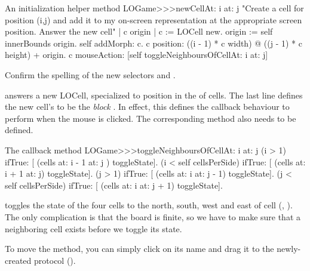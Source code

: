 \documentclass[a4paper,10pt,twoside]{book}
\begin{document}
\begin{method}[newCellAt:at:]{An initialization helper method}
LOGame>>>newCellAt: i at: j
   "Create a cell for position (i,j) and add it to my on-screen
   representation at the appropriate screen position.  Answer the new cell"
   | c origin |
   c := LOCell new.
   origin := self innerBounds origin.
   self addMorph: c.
   c position: ((i - 1) * c width) @ ((j - 1) * c height) + origin.
   c mouseAction: [self toggleNeighboursOfCellAt: i at: j]
\end{method}

Confirm the spelling of the new selectors  and .

 answers a new LOCell, specialized to position  in the  of cells.
The last line defines the new cell's  to be the \emph{block}
\mbox{.}
 In effect, this defines the callback behaviour to perform when the mouse is clicked.
The corresponding method also needs to be defined.

\begin{method}[toggleNeighboursOfCellAt:at:]{The callback method}
LOGame>>>toggleNeighboursOfCellAt: i at: j
   (i > 1) ifTrue: [ (cells at: i - 1 at: j ) toggleState].
   (i < self cellsPerSide) ifTrue: [ (cells at: i + 1 at: j) toggleState].
   (j > 1) ifTrue: [ (cells at: i  at: j - 1) toggleState].
   (j < self cellsPerSide) ifTrue: [ (cells at: i at: j + 1) toggleState].
\end{method}

 toggles the state of the four cells to the north, south, west and east of cell (, ).  The only complication is that the board is finite, so we have to make sure that a neighboring cell exists before we toggle its state.

To move the method, you can simply click on its name and drag it to the newly-created protocol ().
\end{document}
